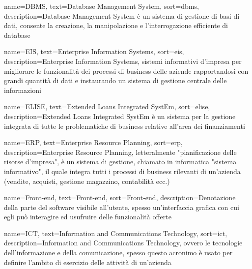  
{
    name=DBMS,
    text=Database Management System,
    sort=dbms,
    description={Database Management System è un sistema di gestione di basi di dati, consente la creazione, la manipolazione e l'interrogazione efficiente di database}
}

{
    name=EIS,
    text=Enterprise Information Systems,
    sort=eis,
    description={Enterprise Information Systems, sistemi informativi d'impresa per migliorare le funzionalità dei processi di business delle aziende rapportandosi con grandi quantità di dati e instaurando un sistema di gestione centrale delle informazioni}
}

{
    name=ELISE,
    text=Extended Loans Integrated SystEm,
    sort=elise,
    description={Extended Loans Integrated SystEm è un sistema per la gestione integrata di tutte le problematiche di business relative all'area dei finanziamenti}
}

{
    name=ERP,
    text=Enterprise Resource Planning,
    sort=erp,
    description={Enterprise Resource Planning, letteralmente "pianificazione delle risorse d'impresa", è un sistema di gestione, chiamato in informatica "sistema informativo", il quale integra tutti i processi di business rilevanti di un'azienda (vendite, acquisti, gestione magazzino, contabilità ecc.)}
}


{
    name=Front-end,
    text=Front-end,
    sort=Front-end,
    description={Denotazione della parte del software visibile all'utente, spesso un'interfaccia grafica con cui egli può interagire ed usufruire delle funzionalità offerte}
}



{
    name=ICT,
    text=Information and Communications Technology,
    sort=ict,
    description={Information and Communications Technology, ovvero le tecnologie dell’informazione e della comunicazione, spesso questo acronimo è usato per definire l'ambito di esercizio delle attività di un'azienda}
}

